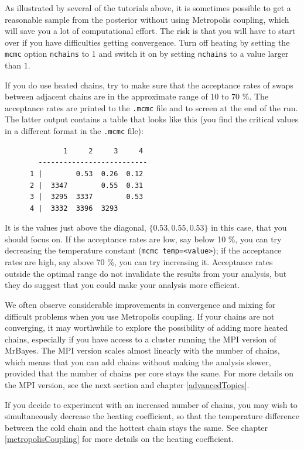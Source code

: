 \documentclass[12pt]{book}
\newcommand{\ttt}[1]{\texttt{#1}}
\begin{document}
As illustrated by several of the tutorials above, it is sometimes possible to get a reasonable
sample from the posterior without using Metropolis coupling, which will save you a lot of
computational effort. The risk is that you will have to start over if you have difficulties getting
convergence. Turn off heating by setting the \ttt{mcmc} option \ttt{nchains} to 1 and switch it on
by setting \ttt{nchains} to a value larger than $1$.

If you do use heated chains, try to make sure that the acceptance rates of swaps between adjacent
chains are in the approximate range of 10 to 70 \%. The acceptance rates are printed to the
\ttt{.mcmc} file and to screen at the end of the run. The latter output contains a table that looks
like this (you find the critical values in a different format in the \ttt{.mcmc} file):

\footnotesize
\begin{singlespacing}
\begin{verbatim}
              1     2     3     4 
        --------------------------
      1 |        0.53  0.26  0.12 
      2 |  3347        0.55  0.31 
      3 |  3295  3337        0.53 
      4 |  3332  3396  3293       
\end{verbatim}
\end{singlespacing}
\normalsize

It is the values just above the diagonal, $\{0.53, 0.55, 0.53\}$ in this case, that you should
focus on. If the acceptance rates are low, say below 10 \%, you can try decreasing the temperature
constant (\ttt{mcmc temp=<value>}); if the acceptance rates are high, say above 70 \%, you can try
increasing it. Acceptance rates outside the optimal range do not invalidate the results from your
analysis, but they do suggest that you could make your analysis more efficient.

We often observe considerable improvements in convergence and mixing for difficult problems when
you use Metropolis coupling. If your chains are not converging, it may worthwhile to explore the
possibility of adding more heated chains, especially if you have access to a cluster running the
MPI version of MrBayes. The MPI version scales almost linearly with the number of chains, which
means that you can add chains without making the analysis slower, provided that the number of
chains per core stays the same. For more details on the MPI version, see the next section and
chapter \ref{advancedTopics}.

If you decide to experiment with an increased number of chains, you may wish to simultaneously
decrease the heating coefficient, so that the temperature difference between the cold chain and the
hottest chain stays the same. See chapter \ref{metropolisCoupling} for more details on the heating
coefficient.
\end{document}
